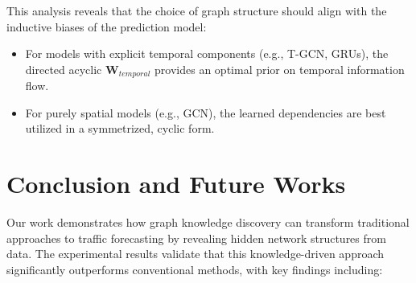 \documentclass[pdflatex,sn-mathphys-num]{sn-jnl}%
\theoremstyle{thmstyleone}%
\theoremstyle{thmstyletwo}%
\theoremstyle{thmstylethree}%
\begin{document}

This analysis reveals that the choice of graph structure should align with the inductive biases of the prediction model:
\begin{itemize}
    \item For models with explicit temporal components (e.g., T-GCN, GRUs), the directed acyclic $\mathbf{W}_{temporal}$ provides an optimal prior on temporal information flow.
    \item For purely spatial models (e.g., GCN), the learned dependencies are best utilized in a symmetrized, cyclic form.
\end{itemize}




\section{Conclusion and Future Works}\label{sec:conclusion}

Our work demonstrates how graph knowledge discovery can transform traditional approaches to traffic forecasting by revealing hidden network structures from data. The experimental results validate that this knowledge-driven approach significantly outperforms conventional methods, with key findings including:
\end{document}
